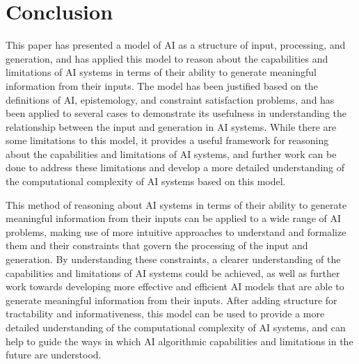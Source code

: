 \documentclass[stu,12pt]{apa7}
\theoremstyle{definition}
\begin{document}
\section{Conclusion}

This paper has presented a model of AI as a structure of input, processing, and generation, and has applied this model to reason about the capabilities and limitations of AI systems in terms of their ability to generate meaningful information from their inputs. The model has been justified based on the definitions of AI, epistemology, and constraint satisfaction problems, and has been applied to several cases to demonstrate its usefulness in understanding the relationship between the input and generation in AI systems. While there are some limitations to this model, it provides a useful framework for reasoning about the capabilities and limitations of AI systems, and further work can be done to address these limitations and develop a more detailed understanding of the computational complexity of AI systems based on this model.

This method of reasoning about AI systems in terms of their ability to generate meaningful information from their inputs can be applied to a wide range of AI problems, making use of more intuitive approaches to understand and formalize them and their constraints that govern the processing of the input and generation. By understanding these constraints, a clearer understanding of the capabilities and limitations of AI systems could be achieved, as well as further work towards developing more effective and efficient AI models that are able to generate meaningful information from their inputs. After adding structure for tractability and informativeness, this model can be used to provide a more detailed understanding of the computational complexity of AI systems, and can help to guide the ways in which AI algorithmic capabilities and limitations in the future are understood.

\newpage
\printbibliography
\end{document}
